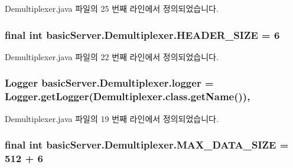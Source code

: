 Demultiplexer.\+java 파일의 25 번째 라인에서 정의되었습니다.

\hypertarget{classbasic_server_1_1_demultiplexer_a43686b9c044fc363ba7a9eae1f79120f}{
\subsubsection[{H\+E\+A\+D\+E\+R\+\_\+\+S\+I\+Z\+E}]{\setlength{\rightskip}{0pt plus 5cm}final int basic\+Server.\+Demultiplexer.\+H\+E\+A\+D\+E\+R\+\_\+\+S\+I\+Z\+E = 6\hspace{0.3cm}{\ttfamily [private]}}}\label{classbasic_server_1_1_demultiplexer_a43686b9c044fc363ba7a9eae1f79120f}


Demultiplexer.\+java 파일의 22 번째 라인에서 정의되었습니다.

\hypertarget{classbasic_server_1_1_demultiplexer_afea28eb5eb1482f56ce6b661232767b1}{
\subsubsection[{logger}]{\setlength{\rightskip}{0pt plus 5cm}Logger basic\+Server.\+Demultiplexer.\+logger = Logger.\+get\+Logger(Demultiplexer.\+class.\+get\+Name())\hspace{0.3cm}{\ttfamily [static]}, {\ttfamily [private]}}}\label{classbasic_server_1_1_demultiplexer_afea28eb5eb1482f56ce6b661232767b1}


Demultiplexer.\+java 파일의 19 번째 라인에서 정의되었습니다.

\hypertarget{classbasic_server_1_1_demultiplexer_a22d173243d9c6e9b3715330181f2d891}{
\subsubsection[{M\+A\+X\+\_\+\+D\+A\+T\+A\+\_\+\+S\+I\+Z\+E}]{\setlength{\rightskip}{0pt plus 5cm}final int basic\+Server.\+Demultiplexer.\+M\+A\+X\+\_\+\+D\+A\+T\+A\+\_\+\+S\+I\+Z\+E = 512 + 6\hspace{0.3cm}{\ttfamily [private]}}}\label{classbasic_server_1_1_demultiplexer_a22d173243d9c6e9b3715330181f2d891}


